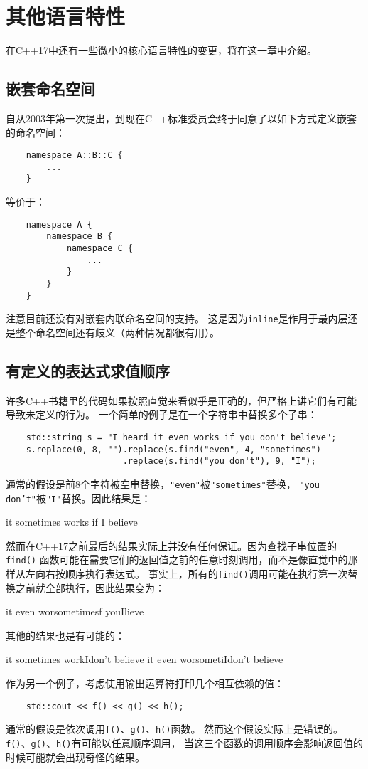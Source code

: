 \chapter{其他语言特性}\label{ch8}
在C++17中还有一些微小的核心语言特性的变更，将在这一章中介绍。

\section{嵌套命名空间}\label{ch8.1}
自从2003年第一次提出，到现在C++标准委员会终于同意了以如下方式定义嵌套的命名空间：
\begin{lstlisting}
    namespace A::B::C {
        ...
    }
\end{lstlisting}
等价于：
\begin{lstlisting}
    namespace A {
        namespace B {
            namespace C {
                ...
            }
        }
    }
\end{lstlisting}
注意目前还没有对嵌套内联命名空间的支持。
这是因为\texttt{inline}是作用于最内层还是整个命名空间还有歧义（两种情况都很有用）。

\section{有定义的表达式求值顺序}\label{ch8.2}
许多C++书籍里的代码如果按照直觉来看似乎是正确的，但严格上讲它们有可能导致未定义的行为。
一个简单的例子是在一个字符串中替换多个子串：
\begin{lstlisting}
    std::string s = "I heard it even works if you don't believe";
    s.replace(0, 8, "").replace(s.find("even", 4, "sometimes")
                       .replace(s.find("you don't"), 9, "I");
\end{lstlisting}
通常的假设是前8个字符被空串替换，\texttt{"even"}被\texttt{"sometimes"}替换，
\texttt{"you don't"}被\texttt{"I"}替换。因此结果是：
\begin{blacklisting}
    it sometimes works if I believe
\end{blacklisting}
然而在C++17之前最后的结果实际上并没有任何保证。因为查找子串位置的\texttt{find()}
函数可能在需要它们的返回值之前的任意时刻调用，而不是像直觉中的那样从左向右按顺序执行表达式。
事实上，所有的\texttt{find()}调用可能在执行第一次替换之前就全部执行，因此结果变为：

\begin{blacklisting}
    it even worsometimesf youIlieve
\end{blacklisting}
其他的结果也是有可能的：
\begin{blacklisting}
    it sometimes workIdon’t believe
    it even worsometiIdon’t believe
\end{blacklisting}
作为另一个例子，考虑使用输出运算符打印几个相互依赖的值：
\begin{lstlisting}
    std::cout << f() << g() << h();
\end{lstlisting}
通常的假设是依次调用\texttt{f()}、\texttt{g()}、\texttt{h()}函数。
然而这个假设实际上是错误的。\texttt{f()}、\texttt{g()}、\texttt{h()}有可能以任意顺序调用，
当这三个函数的调用顺序会影响返回值的时候可能就会出现奇怪的结果。

